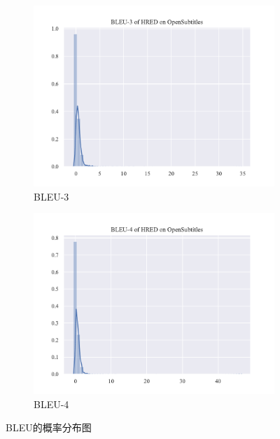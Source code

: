 \begin{figure}
\begin{subfigure}{0.5\linewidth}
        \includegraphics[width=\linewidth]{figure/distplot/opensub/hred/bleu_3/plot.pdf}
        \caption{BLEU-3}
    \end{subfigure}%
    \begin{subfigure}{0.5\linewidth}
        \centering
        \includegraphics[width=\linewidth]{figure/distplot/opensub/hred/bleu_4/plot.pdf}
        \caption{BLEU-4}
    \end{subfigure}
    \centering
    \caption{BLEU的概率分布图}
    \label{fig:BLEU_dist}
\end{figure}
